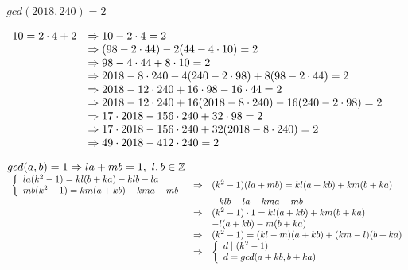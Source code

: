 \documentclass[a4paper, 11pt]{article}
\begin{document}
\begin{myEnumerate}
\begin{myEnumerate}
        $gcd(2018, 240) = 2$ 
        
        \(
        \begin{array}{lll}
        	10 = 2 \cdot 4 + 2 & \Rightarrow 10 - 2 \cdot 4 = 2 \\
            				   & \Rightarrow (98 - 2 \cdot 44) - 2(44 - 4 \cdot 10) = 2 \\
            				   & \Rightarrow 98 - 4 \cdot 44 + 8 \cdot 10 = 2 \\
                               & \Rightarrow 2018 - 8 \cdot 240 - 4(240 - 2 \cdot 98) + 8(98 - 2 \cdot 44) = 2 \\
                               & \Rightarrow 2018 - 12 \cdot 240 + 16 \cdot 98 - 16 \cdot 44 = 2 \\
                               & \Rightarrow 2018 - 12 \cdot 240 + 16(2018 - 8 \cdot 240) - 16(240 - 2 \cdot 98) = 2 \\
                               & \Rightarrow 17 \cdot 2018 - 156 \cdot 240 + 32 \cdot 98 = 2 \\
                               & \Rightarrow 17 \cdot 2018 - 156 \cdot 240 + 32(2018 - 8 \cdot 240) = 2 \\
                               & \Rightarrow 49 \cdot 2018 - 412 \cdot 240 = 2
        \end{array} \\\\ \)
        
        \item
        $gcd(a,b) = 1 \Rightarrow la + mb = 1, \textnormal{ } l,b \in \mathbb{Z}$ \\
        \( \\
        \begin{array}{lll}
       		\left\{
    			\begin{array}{l}
        			la(k^{2} - 1) = kl(b + ka) - klb - la \\
        			mb(k^{2} - 1) = km(a + kb) - kma - mb
    			\end{array}
			\right.
        & \Rightarrow & (k^{2} - 1)(la + mb) = kl(a + kb) + km(b + ka) \\
        && 									   - klb - la - kma - mb \\
        & \Rightarrow & (k^{2} - 1) \cdot 1 = kl(a + kb) + km(b + ka) \\
        &&									  - l(a + kb) - m(b + ka) \\
        & \Rightarrow & (k^{2} - 1) = (kl - m)(a + kb) + (km - l)(b + ka) \\
        & \Rightarrow &
        \left\{
    			\begin{array}{l}
        			d \mid (k^{2} - 1) \\
        			d = gcd(a + kb, b + ka)
    			\end{array}
			\right.
        \end{array} \)
        

\end{myEnumerate}
\end{myEnumerate}
\end{document}
